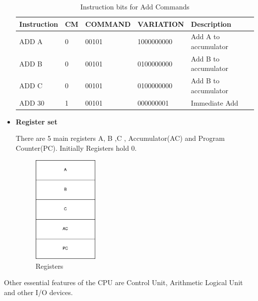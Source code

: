 \documentclass[a4paper,12pt]{article}
\begin{document}
\begin{itemize}
        \begin{table}[H]
           \footnotesize
           \setlength{\tabcolsep}{0.3em} %
           \renewcommand{\arraystretch}{1.6}
           \centering
           \begin{tabular}{|l|l|l|l|l|}
            \hline
            \textbf{Instruction} & \textbf{CM} & \textbf{COMMAND}  & \textbf{VARIATION} & \textbf{Description}\\ \hline
            ADD A & 0 & 00101 & 1000000000 & Add A to accumulator\\ \hline
            ADD B & 0 & 00101 & 0100000000 & Add B to accumulator\\ \hline
            ADD C & 0 & 00101 & 0100000000 & Add B to accumulator\\ \hline
            ADD 30 & 1 & 00101 & 000000001 & Immediate Add\\ \hline
           \end{tabular} 
           \caption{Instruction bits for Add Commands}
        \end{table}
        \newpage
        \item \textbf{Register set} 
        
         There are 5 main registers A, B ,C , Accumulator(AC) and Program Counter(PC). Initially Registers hold 0. 

        \begin{figure}[H]
            \centering
            \includegraphics[width=0.3\textwidth ]{./images/registers.png}
            \caption{Registers}
        \end{figure}
    \end{itemize}

    Other essential features of the CPU are Control Unit, Arithmetic Logical Unit and other I/O devices. 
\end{document}
